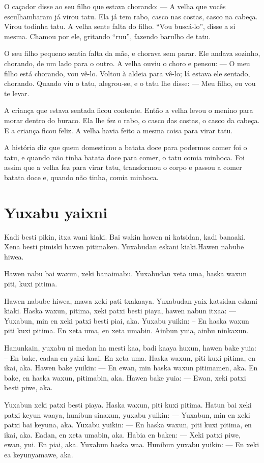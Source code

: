 O caçador disse ao seu
filho que estava chorando:
— A velha que vocês esculhambaram
já virou tatu. Ela já tem rabo, casco
nas costas, casco na cabeça. Virou
todinha tatu. A velha sente falta
do filho. “Vou buscá-lo”, disse a
si mesma. Chamou por ele, gritando
“ruu”, fazendo barulho de tatu.

O seu filho pequeno sentia falta
da mãe, e chorava sem parar.
Ele andava sozinho, chorando,
de um lado para o outro.
A velha ouviu o choro e pensou:
— O meu filho está chorando, vou vê-lo.
Voltou à aldeia para vê-lo; lá estava ele
sentado, chorando. Quando viu o tatu,
alegrou-se, e o tatu lhe disse:
— Meu filho, eu vou te levar.

A criança que estava
sentada ficou contente.
Então a velha levou o menino
para morar dentro do buraco.
Ela lhe fez o rabo, o casco das
costas, o casco da cabeça.
E a criança ficou feliz.
A velha havia feito a mesma
coisa para virar tatu.

A história diz que quem
domesticou a batata doce para
podermos comer foi o tatu, e
quando não tinha batata doce
para comer, o tatu comia minhoca.
Foi assim que a velha fez para
virar tatu, transformou o corpo
e passou a comer batata doce e,
quando não tinha, comia minhoca.

\chapter{Yuxabu yaixni}

Kadi besti pikin, itxa wani kiaki.
Bai wakin hawen ni katsidan, kadi banaaki.
Xena besti pimiski hawen pitimaken.
Yuxabudan eskani kiaki.Hawen
nabube hiwea.


Hawen nabu bai waxun, xeki
banaimabu. Yuxabudan xeta uma,
haska waxun piti, kuxi pitima.

Hawen nabube hiwea,
mawa xeki pati txakaaya.
Yuxabudan yaix katsidan
eskani kiaki. Haska waxun,
pitima, xeki patxi besti piaya,
hawen nabun itxaa:
— Yuxabun, min en xeki
patxi besti piai, aka.
Yuxabu yuikin:
– En haska waxun piti kuxi
pitima. En xeta uma, en xeta
umabin. Ainbun yuia, ainbu
ninkaxun.

Hanunkain, yuxabu ni medan
ha mesti kaa, badi kaaya
huxun, hawen bake yuia:
– En bake, eadan en yaixi kaai. En
xeta uma. Haska waxun,
piti kuxi pitima, en ikai, aka.
Hawen bake yuikin:
— En ewan, min haska waxun
pitimamen, aka. En bake, en haska
waxun, pitimabin, aka.
Hawen bake yuia:
— Ewan, xeki patxi
besti piwe, aka.

Yuxabun xeki patxi besti piaya.
Haska waxun, piti kuxi pitima.
Hatun bai xeki patxi keyun waaya,
hunibun sinaxun, yuxabu yuikin:
— Yuxabun, min en xeki
patxi bai keyuna, aka.
Yuxabu yuikin:
— En haska waxun, piti kuxi
pitima, en ikai, aka. Eadan,
en xeta umabin, aka.
Habia en baken:
— Xeki patxi piwe, ewan,
yui. En piai, aka.
Yuxabun haska waa.
Hunibun yuxabu yuikin:
— En xeki ea keyunyamawe, aka.

